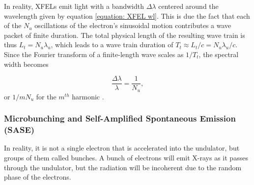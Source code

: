 \documentclass[aps,prb,twocolumn,superscriptaddress]{revtex4-2}
\begin{document}
    In reality, XFELs emit light with a bandwidth $\Delta\lambda$ centered
around the wavelength given by equation \ref{equation: XFEL wl}. This is due
the fact that each of the $N_u$ oscillations of the electron's sinusoidal motion 
contributes a wave packet of finite duration. The total physical length of the
resulting wave train is thus $L_t = N_u\lambda_u$, which leads to a wave train
duration of $T_t \approx L_t/c = N_u\lambda_u/c$. Since the Fourier transform 
of a finite-length wave scales as $1/T_t$, the spectral width becomes

\begin{equation}
    \frac{\Delta\lambda}{\lambda} = \frac{1}{N_u},
\end{equation}\label{eq:spread}
or $1/mN_u$ for the $m^{th}$ harmonic \cite{CERN}.

\subsubsection{Microbunching and Self-Amplified Spontaneous Emission (SASE)}

In reality, it is not a single electron that is accelerated into the undulator,
but groups of them called bunches. A bunch of electrons will emit X-rays as it
passes through the undulator, but the radiation will be incoherent due to the
random phase of the electrons. 
\end{document}
